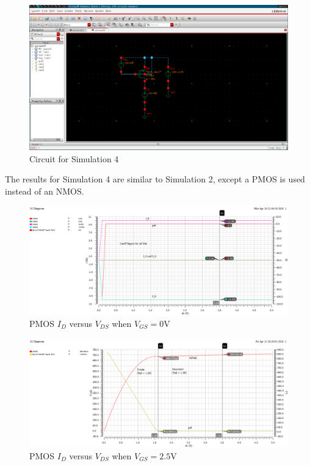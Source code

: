 \FloatBarrier

\begin{figure}[h!]
	\centering
	\includegraphics[scale=0.75]{../images/circuit4.PNG}
	\caption{Circuit for Simulation 4}
	\label{fig:circuit4}
\end{figure}

\FloatBarrier
The results for Simulation 4 are similar to Simulation 2, except a PMOS is used instead of an NMOS.

\FloatBarrier

\begin{figure}[h!]
	\centering
	\includegraphics[scale=0.75]{../images/id_vs_vds_vgs_is_0_pmos.PNG}
	\caption{PMOS $I_{D}$ versus $V_{DS}$ when $V_{GS} = 0$\si{\volt}}
	\label{fig:id_vs_vds_vgs_is_0_pmos}
\end{figure}

\FloatBarrier

\FloatBarrier

\begin{figure}[h!]
	\centering
	\includegraphics[scale=0.75]{../images/id_vs_vds_vgs_is_2_5_pmos.PNG}
	\caption{PMOS $I_{D}$ versus $V_{DS}$ when $V_{GS} = 2.5$\si{\volt}}
	\label{fig:id_vs_vds_vgs_is_2_5_pmos}
\end{figure}

